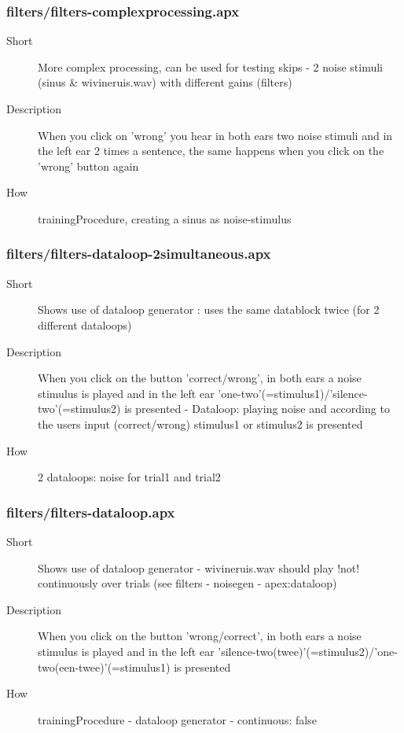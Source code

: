 \subsubsection{filters/filters-complexprocessing.apx}
\begin{description}
\item[Short] 
 More complex processing, can be used for testing skips - 2 noise stimuli (sinus \& wivineruis.wav) with different gains (filters)
\item[Description] 
 When you click on 'wrong' you hear in both ears two noise stimuli and in the left ear 2 times a sentence, the same happens when you click on the 'wrong' button again
\item[How] 
 trainingProcedure, creating a sinus as noise-stimulus
\end{description}

\subsubsection{filters/filters-dataloop-2simultaneous.apx}
\begin{description}
\item[Short] 
 Shows use of dataloop generator : uses the same datablock twice (for 2 different dataloops)
\item[Description] 
 When you click on the button 'correct/wrong', in both ears a noise stimulus is played and in the left ear 'one-two'(=stimulus1)/'silence-two'(=stimulus2) is presented - Dataloop: playing noise and according to the users input (correct/wrong) stimulus1 or stimulus2 is presented
\item[How] 
 2 dataloops: noise for trial1 and trial2
\end{description}

\subsubsection{filters/filters-dataloop.apx}
\begin{description}
\item[Short] 
 Shows use of dataloop generator - wivineruis.wav should play !not! continuously over trials (see filters - noisegen - apex:dataloop)
\item[Description] 
 When you click on the button 'wrong/correct', in both ears a noise stimulus is played and in the left ear 'silence-two(twee)'(=stimulus2)/'one-two(een-twee)'(=stimulus1) is presented
\item[How] 
 trainingProcedure - dataloop generator - continuous: false
\end{description}

